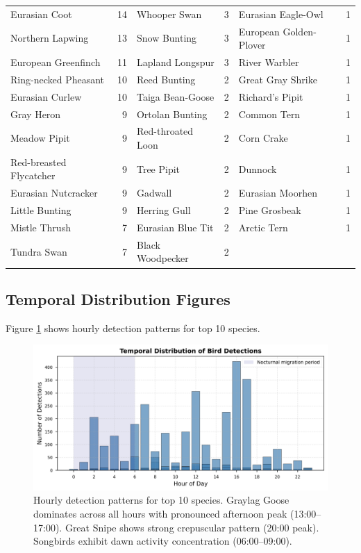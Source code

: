 \documentclass[twocolumn]{article}
\begin{document}
\begin{table}[H]
\begin{tabular}{lr|lr|lr}
Eurasian Coot & 14 & Whooper Swan & 3 & Eurasian Eagle-Owl & 1 \\
Northern Lapwing & 13 & Snow Bunting & 3 & European Golden-Plover & 1 \\
European Greenfinch & 11 & Lapland Longspur & 3 & River Warbler & 1 \\
Ring-necked Pheasant & 10 & Reed Bunting & 2 & Great Gray Shrike & 1 \\
Eurasian Curlew & 10 & Taiga Bean-Goose & 2 & Richard's Pipit & 1 \\
Gray Heron & 9 & Ortolan Bunting & 2 & Common Tern & 1 \\
Meadow Pipit & 9 & Red-throated Loon & 2 & Corn Crake & 1 \\
Red-breasted Flycatcher & 9 & Tree Pipit & 2 & Dunnock & 1 \\
Eurasian Nutcracker & 9 & Gadwall & 2 & Eurasian Moorhen & 1 \\
Little Bunting & 9 & Herring Gull & 2 & Pine Grosbeak & 1 \\
Mistle Thrush & 7 & Eurasian Blue Tit & 2 & Arctic Tern & 1 \\
Tundra Swan & 7 & Black Woodpecker & 2 &  &  \\
\bottomrule
\end{tabular}
\end{table}

\subsection{Temporal Distribution Figures}

Figure \ref{fig:temporal} shows hourly detection patterns for top 10 species.

\begin{figure}[H]
\centering
\includegraphics[width=\textwidth]{figures/temporal_distribution.png}
\caption{Hourly detection patterns for top 10 species. Graylag Goose dominates across all hours with pronounced afternoon peak (13:00--17:00). Great Snipe shows strong crepuscular pattern (20:00 peak). Songbirds exhibit dawn activity concentration (06:00--09:00).}
\label{fig:temporal}
\end{figure}
\end{document}
